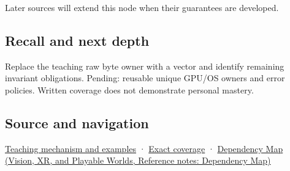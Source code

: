 Later sources will extend this node when their guarantees are developed.

\subsection{Recall and next depth}\label{appendix-7679107d057e-recall-and-next-depth}

Replace the teaching raw byte owner with a vector and identify remaining invariant obligations. Pending: reusable unique GPU/OS owners and error policies. Written coverage does not demonstrate personal mastery.

\subsection{Source and navigation}\label{appendix-7679107d057e-source-and-navigation}

\hyperref[01-foundations-i-ch003-from-three-repairs-to-five-decisions-to-zero-boilerplate]{Teaching mechanism and examples} · \hyperref[appendix-fd090d982a15-m009---parts-127-147]{Exact coverage} · \href{../07-Vision-XR-and-Playable-Worlds/main.pdf\#nameddest=appendix-4ad47bdd269a}{Dependency Map (Vision, XR, and Playable Worlds, Reference notes: Dependency Map)}
